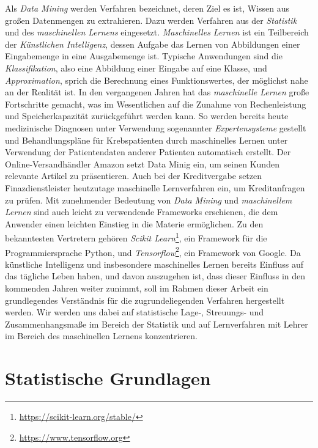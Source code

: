 \documentclass[fontsize=11pt]{scrartcl}
\begin{document}
            Als \emph{Data Mining} werden Verfahren bezeichnet, deren Ziel es ist, Wissen aus großen Datenmengen zu extrahieren. Dazu werden Verfahren aus der \emph{Statistik} und des \emph{maschinellen Lernens} eingesetzt.\cite{ertel2016}
            \emph{Maschinelles Lernen} ist ein Teilbereich der \emph{Künstlichen Intelligenz}, dessen Aufgabe das Lernen von Abbildungen einer Eingabemenge in eine Ausgabemenge ist. Typische Anwendungen sind die \emph{Klassifikation}, also eine Abbildung einer Eingabe auf eine Klasse, und \emph{Approximation}, sprich die Berechnung eines Funktionswertes, der möglichst nahe an der Realität ist.\cite{ertel2016,mlfor}
            In den vergangenen Jahren hat das \emph{maschinelle Lernen} große Fortschritte gemacht, was im Wesentlichen auf die Zunahme von Rechenleistung und Speicherkapazität zurückgeführt werden kann.\cite{mlfor}
            So werden bereits heute medizinische Diagnosen unter Verwendung sogenannter \emph{Expertensysteme} gestellt\cite{ertel2016} und Behandlungspläne für Krebspatienten durch maschinelles Lernen unter Verwendung der Patientendaten anderer Patienten automatisch erstellt.\cite{mlfor}
            Der Online-Versandhändler Amazon setzt Data Minig ein, um seinen Kunden relevante Artikel zu präsentieren.\cite{ertel2016}
            Auch bei der Kreditvergabe setzen Finazdienstleister heutzutage maschinelle Lernverfahren ein, um Kreditanfragen zu prüfen.\cite{mlfor}
            Mit zunehmender Bedeutung von \emph{Data Mining} und \emph{maschinellem Lernen} sind auch leicht zu verwendende Frameworks erschienen, die dem Anwender einen leichten Einstieg in die Materie ermöglichen. Zu den bekanntesten Vertretern gehören \emph{Scikit Learn}\footnote{\url{https://scikit-learn.org/stable/}}, ein Framework für die Programmiersprache Python, und \emph{Tensorflow}\footnote{\url{https://www.tensorflow.org}}, ein Framework von Google.
            Da künstliche Intelligenz und insbesondere maschinelles Lernen bereits Einfluss auf das tägliche Leben haben, und davon auszugehen ist, dass dieser Einfluss in den kommenden Jahren weiter zunimmt, soll im Rahmen dieser Arbeit ein grundlegendes Verständnis für die zugrundeliegenden Verfahren hergestellt werden. Wir werden uns dabei auf statistische Lage-, Streuungs- und Zusammenhangsmaße im Bereich der Statistik und auf Lernverfahren mit Lehrer im Bereich des maschinellen Lernens konzentrieren.

        \section{Statistische Grundlagen}
            
\end{document}
